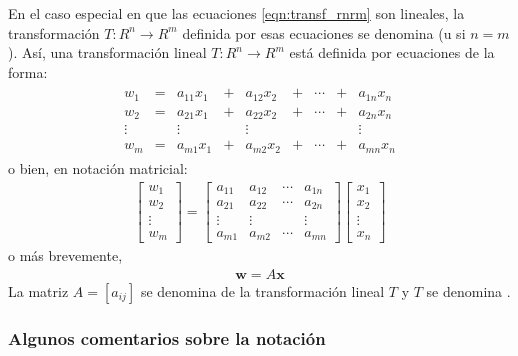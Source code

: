 \documentclass[a4paper,12pt]{article}
\begin{document}
En el caso especial en que las ecuaciones \eqref{eqn:transf_rnrm} son
lineales, la transformación $T:R^n\rightarrow R^m$ definida por esas
ecuaciones se denomina  (u  si
$n=m$). Así, una transformación lineal $T:R^n\rightarrow R^m$ está definida
por ecuaciones de la forma:
\begin{align*}
  \begin{matrix}
    w_1   &=& a_{11}x_1 &+& a_{12}x_2 &+& \cdots &+& a_{1n}x_n \\
    w_2   &=& a_{21}x_1 &+& a_{22}x_2 &+& \cdots &+& a_{2n}x_n \\
    \vdots& & \vdots    & &\vdots     & &        & &\vdots     \\
    w_m   &=& a_{m1}x_1 &+& a_{m2}x_2 &+& \cdots &+& a_{mn}x_n 
  \end{matrix}
\end{align*}
o bien, en notación matricial:
\begin{align*}
  \begin{bmatrix}
    w_1    \\
    w_2    \\
    \vdots \\
    w_m
  \end{bmatrix} =
  \begin{bmatrix}
    a_{11}& a_{12}& \cdots& a_{1n}\\
    a_{21}& a_{22}& \cdots& a_{2n}\\
    \vdots&\vdots &       &\vdots \\
    a_{m1}& a_{m2}& \cdots& a_{mn}
  \end{bmatrix}
  \begin{bmatrix}
    x_1    \\
    x_2    \\
    \vdots \\
    x_n
  \end{bmatrix}
\end{align*}
o más brevemente,
\begin{align*}
  \mathbf{w}=A\mathbf{x}
\end{align*}
La matriz $A=[a_{ij}]$ se denomina  de la transformación
lineal $T$ y $T$ se denomina .

\subsubsection{Algunos comentarios sobre la notación}
\end{document}
